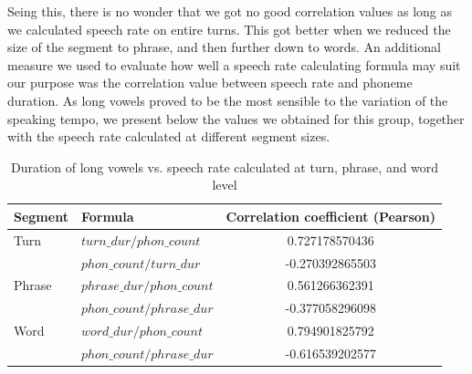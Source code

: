 \documentclass[a4paper]{scrreprt}
\begin{document}
Seing this, there is no wonder that we got no good correlation values as long as we calculated speech rate on entire turns. This got better when we reduced the size of the segment to phrase, and then further down to words. 
An additional measure we used to evaluate how well a speech rate calculating formula may suit our purpose was the correlation value between speech rate and phoneme duration. As long vowels proved to be the most sensible to the variation of the speaking tempo, we present below the values we obtained for this group, together with the speech rate calculated at different segment sizes.

\begin{table}[htbp]
\caption {Duration of long vowels vs. speech rate calculated at turn, phrase, and word level} 
\vspace{10mm}
\begin{tabular}{|l|l|c|}
\hline
Segment	 & Formula & Correlation coefficient (Pearson)\\
\hline
\hline
Turn 		& $turn\_dur / phon\_count$ &0.727178570436 \\
	\hline
	&  $phon\_count / turn\_dur$ & -0.270392865503 \\
	\hline
Phrase  & $phrase\_dur / phon\_count$ & 0.561266362391\\
	\hline
	&  $phon\_count / phrase\_dur$ & -0.377058296098\\
	\hline
Word  & $word\_dur / phon\_count$ &  0.794901825792\\
	\hline
	&  $phon\_count / phrase\_dur$ & -0.616539202577\\
	\hline
\end{tabular}
\end{table}
\end{document}
